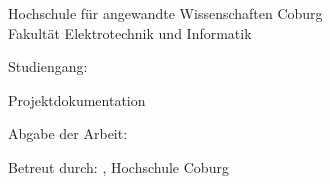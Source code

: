 \centering

\vspace{1cm}

\begin{Large}
    Hochschule für angewandte Wissenschaften Coburg\\
    Fakultät Elektrotechnik und Informatik\par
\end{Large}
\vspace{1cm}

\Large{Studiengang: \Studiengang}
\vspace{1.2cm}

\Large{Projektdokumentation}
\vspace{1cm}

\Huge{\Titel}
\vspace{1.5cm}

\huge{\Autorenname}
\vspace{1.5cm}

\Large{Abgabe der Arbeit: \Abgabe}

\Large{Betreut durch:}
\Large{\Betreuer, Hochschule Coburg}